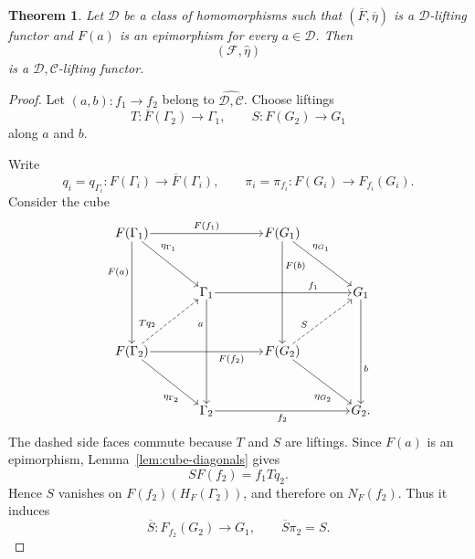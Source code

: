 \documentclass[10pt]{amsart}
\newtheorem{theorem}{Theorem}[section]
\renewcommand{\*}{\cdot {\dots} \cdot}
\newcommand{\?}[1]{\overset{?}{#1}}
\numberwithin{equation}{section}
\begin{document}
\begin{theorem}\label{thm:relative-arrow-lifting}
Let $\mathcal D$ be a class of homomorphisms such that
$(\overline F,\overline\eta)$ is a $\mathcal D$-lifting functor
and $F(a)$ is an epimorphism for every $a\in\mathcal D$. Then
\[
(\mathscr F,\widehat\eta)
\]
is a $\widehat{\mathcal D,\mathcal C}$-lifting functor.
\end{theorem}

\begin{proof}
Let $(a,b)\colon f_1\longrightarrow f_2$
belong to $\widehat{\mathcal D,\mathcal C}$. Choose liftings
\[
T\colon\overline F(\Gamma_2)\longrightarrow\Gamma_1,
\qquad
S\colon F(G_2)\longrightarrow G_1
\]
along $a$ and $b$.

Write
\[
q_i=q_{\Gamma_i}\colon
F(\Gamma_i)\longrightarrow\overline F(\Gamma_i),
\qquad
\pi_i=\pi_{f_i}\colon
F(G_i)\longrightarrow F_{f_i}(G_i).
\]
Consider the cube
\[
\begin{tikzcd}[
  row sep=3.5em,
  column sep=3.8em,
  cells={nodes={inner sep=1pt}}
]
F(\Gamma_1)
  \arrow[rr,"F(f_1)"]
  \arrow[dd,"F(a)"' {pos=0.30}]
  \arrow[dr,"\eta_{\Gamma_1}" {pos=0.28}]
&&
F(G_1)
  \arrow[dd,"F(b)" {pos=0.24}]
  \arrow[dr,"\eta_{G_1}" {pos=0.28}]
&
\\
&
\Gamma_1
  \arrow[rr,"f_1" {pos=0.72}]
  \arrow[dd,"a"' {pos=0.24}]
&&
G_1
  \arrow[dd,"b" {pos=0.66}]
\\
F(\Gamma_2)
  \arrow[rr,"F(f_2)"' {pos=0.72}]
  \arrow[dr,"\eta_{\Gamma_2}"' {pos=0.72}]
  \arrow[ur,dashed,"Tq_2" {pos=0.30}]
&&
F(G_2)
  \arrow[dr,"\eta_{G_2}"' {pos=0.72}]
  \arrow[ur,dashed,"S" {pos=0.30}]
&
\\
&
\Gamma_2
  \arrow[rr,"f_2"']
&&
G_2 .
\end{tikzcd}
\]
The dashed side faces commute because $T$ and $S$ are liftings.
Since $F(a)$ is an epimorphism,
Lemma~\ref{lem:cube-diagonals} gives
\[
SF(f_2)=f_1Tq_2.
\tag{1}
\]
Hence $S$ vanishes on $F(f_2)(H_F(\Gamma_2))$, and therefore on
$N_F(f_2)$. Thus it induces
\[
\overline S\colon F_{f_2}(G_2)\longrightarrow G_1,
\qquad
\overline S\pi_2=S.
\]


\end{proof}
\end{document}
